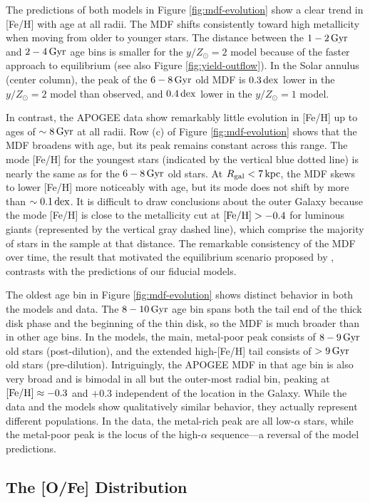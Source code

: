 \documentclass[twocolumn,twocolappendix,linenumbers]{aastex631}
\newcommand{\mathFeH}{{\rm [Fe/H]}}
\newcommand{\yZ}[1]{$y/Z_\odot=#1$}
\newcommand{\kpc}{\,{\rm kpc}}
\newcommand{\Gyr}{\,{\rm Gyr}}
\newcommand{\dex}{\,{\rm dex}}
\begin{document}
The predictions of both models in Figure \ref{fig:mdf-evolution} show a clear trend in [Fe/H] with age at all radii. The MDF shifts consistently toward high metallicity when moving from older to younger stars. The distance between the $1-2\Gyr$ and $2-4\Gyr$ age bins is smaller for the \yZ{2} model because of the faster approach to equilibrium (see also Figure \ref{fig:yield-outflow}). In the Solar annulus (center column), the peak of the $6-8\Gyr$ old MDF is $0.3\dex$ lower in the \yZ{2} model than observed, and $0.4\dex$ lower in the \yZ{1} model.

In contrast, the APOGEE data show remarkably little evolution in [Fe/H] up to ages of $\sim8\Gyr$ at all radii. Row (c) of Figure \ref{fig:mdf-evolution} shows that the MDF broadens with age, but its peak remains constant across this range. The mode [Fe/H] for the youngest stars (indicated by the vertical blue dotted line) is nearly the same as for the $6-8\Gyr$ old stars. At $R_{\rm gal}<7\kpc$, the MDF skews to lower [Fe/H] more noticeably with age, but its mode does not shift by more than $\sim0.1\dex$. It is difficult to draw conclusions about the outer Galaxy because the mode [Fe/H] is close to the metallicity cut at $\mathFeH>-0.4$ for luminous giants (represented by the vertical gray dashed line), which comprise the majority of stars in the sample at that distance. The remarkable consistency of the MDF over time, the result that motivated the equilibrium scenario proposed by \citet{johnson_milky_2024}, contrasts with the predictions of our fiducial models.

The oldest age bin in Figure \ref{fig:mdf-evolution} shows distinct behavior in both the models and data. The $8-10\Gyr$ age bin spans both the tail end of the thick disk phase and the beginning of the thin disk, so the MDF is much broader than in other age bins. In the models, the main, metal-poor peak consists of $8-9\Gyr$ old stars (post-dilution), and the extended high-[Fe/H] tail consists of $>9\Gyr$ old stars (pre-dilution). Intriguingly, the APOGEE MDF in that age bin is also very broad and is bimodal in all but the outer-most radial bin, peaking at $\mathFeH\approx-0.3$ and $+0.3$ independent of the location in the Galaxy. While the data and the models show qualitatively similar behavior, they actually represent different populations. In the data, the metal-rich peak are all low-$\alpha$ stars, while the metal-poor peak is the locus of the high-$\alpha$ sequence---a reversal of the model predictions.

\subsection{The [O/Fe] Distribution}
\label{sec:abundance-distributions}
\end{document}
